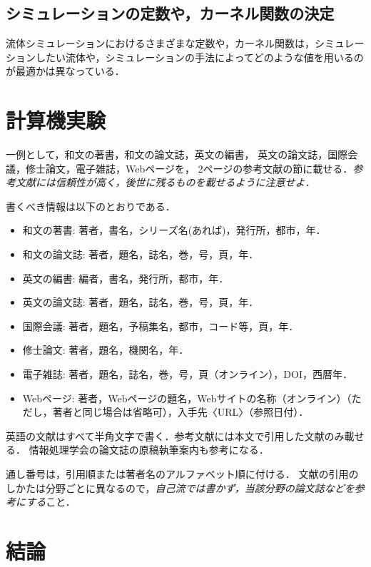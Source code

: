 \documentclass[a4j,12pt]{jreport}
\begin{document}
\section{シミュレーションの定数や，カーネル関数の決定} \label{sec:constant}
流体シミュレーションにおけるさまざまな定数や，カーネル関数は，シミュレーションしたい流体や，シミュレーションの手法によってどのような値を用いるのが最適かは異なっている．
\chapter{計算機実験} \label{chapter:5}

一例として，和文の著書\cite{suetake}，和文の論文誌\cite{kusano}，英文の編書\cite{fuortes}，
英文の論文誌\cite{rice}，国際会議\cite{guibas}，修士論文\cite{chudai}，電子雑誌\cite{iwama}，Webページ\cite{IPSJ}を，
2ページの参考文献の節に載せる．{\em 参考文献には信頼性が高く，後世に残るものを載せるように注意せよ．}

書くべき情報は以下のとおりである．
\begin{itemize}
\item 和文の著書: 著者，書名，シリーズ名(あれば)，発行所，都市，年．
\item 和文の論文誌: 著者，題名，誌名，巻，号，頁，年．
\item 英文の編書: 編者，書名，発行所，都市，年．
\item 英文の論文誌: 著者，題名，誌名，巻，号，頁，年．
\item 国際会議: 著者，題名，予稿集名，都市，コード等，頁，年．
\item 修士論文: 著者，題名，機関名，年．
\item 電子雑誌: 著者，題名，誌名，巻，号，頁（オンライン），DOI，西暦年．
\item Webページ: 著者，Webページの題名，Webサイトの名称（オンライン）（ただし，著者と同じ場合は省略可），入手先〈URL〉（参照日付）．
\end{itemize}
英語の文献はすべて半角文字で書く．参考文献には本文で引用した文献のみ載せる．
情報処理学会の論文誌の原稿執筆案内\cite{IPSJ}も参考になる．

通し番号は，引用順または著者名のアルファベット順に付ける．
文献の引用のしかたは分野ごとに異なるので，{\em 自己流では書かず，当該分野の論文誌などを参考にする}こと．



\chapter{結論} \label{chapter:6}
\end{document}
